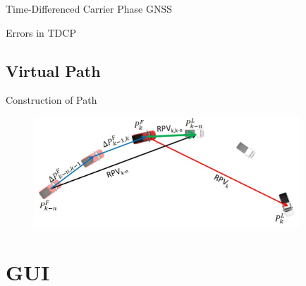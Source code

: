 \documentclass{beamer}
\begin{document}
    \begin{frame}{Time-Differenced Carrier Phase GNSS}
    \end{frame}

    \begin{frame}{Errors in TDCP}
    \end{frame}

  \subsection{Virtual Path}

    \begin{frame}{Construction of Path}
      \begin{figure}
        \includegraphics[width=10cm]{../graphics/path_algorithm.png}
      \end{figure}
    \end{frame}



\section{GUI}
\end{document}
